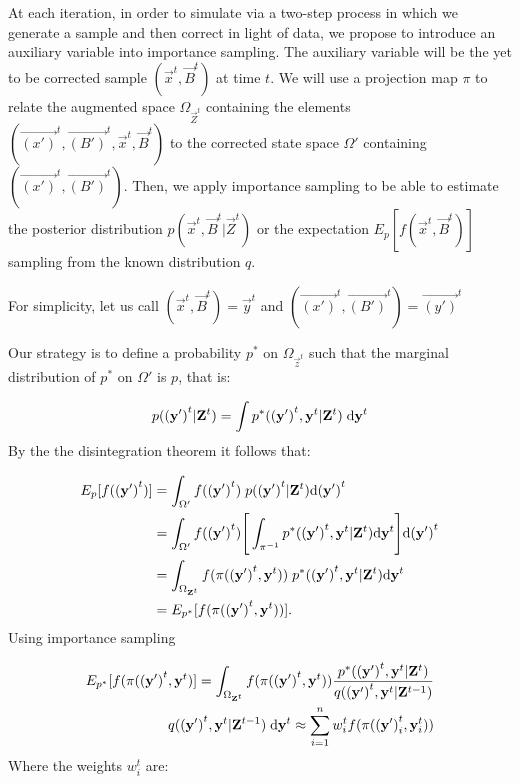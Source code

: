 At each iteration, in order to simulate via a two-step process in which we generate a sample and then correct in light of data, we propose to introduce an auxiliary variable into importance sampling. The auxiliary variable will be the yet to be corrected sample $(\vec{x}^{t}, \vec{B}^{t})$ at time $t$. We will use a projection map $\pi$ to relate the augmented space $\Omega_{\vec{Z}^{t}}$ containing the elements $(\vec{(x')}^{t}, \vec{(B')}^{t}, \vec{x}^{t}, \vec{B}^{t})$ to the corrected state space $\Omega'$ containing $(\vec{(x')}^{t}, \vec{(B')}^{t})$. Then, we apply importance sampling to be able to estimate the posterior distribution $p(\vec{x}^{t}, \vec{B}^{t} | \vec{Z}^{t})$ or the expectation $E_{p}[f(\vec{x}^{t},\vec{B}^{t})]$ sampling from the known distribution $q$.

For simplicity, let us call $(\vec{x}^{t}, \vec{B}^{t}) = \vec{y}^{t}$ and $(\vec{(x')}^{t}, \vec{(B')}^{t}) = \vec{(y')}^{t}$

Our strategy is to define a probability $p^*$ on $\Omega_{\vec{z}^{t}}$ such that the marginal distribution of $p^*$ on $\Omega'$ is $p$, that is:

\[
p(\mathbf{(y')}^{t} | \mathbf{Z}^{t}) = \int p^*(\mathbf{(y')}^{t}, \mathbf{y}^{t} | \mathbf{Z}^{t})\; \mathrm{d} \mathbf{y}^{t}
\]
By the the disintegration theorem it follows that:

\begin{align*}
E_{p}[f(\mathbf{(y')}^{t})]  &= \int_{\Omega'} f(\mathbf{(y')}^{t})\; p(\mathbf{(y')}^{t} | \mathbf{Z}^{t}) \mathrm{d} \mathbf{(y')}^{t} \\
&= \int_{\Omega'} f(\mathbf{(y')}^{t})\Bigg[\int_{\pi^{-1}} p^*(\mathbf{(y')}^{t}, \mathbf{y}^{t} | \mathbf{Z}^{t}) \mathrm{d} \mathbf{y}^{t}\Bigg] \mathrm{d} \mathbf{(y')}^{t} \\ 
&= \int_{\Omega_{\mathbf{Z}^{t}}} f(\pi(\mathbf{(y')}^{t}, \mathbf{y}^{t}))\; p^*(\mathbf{(y')}^{t}, \mathbf{y}^{t} | \mathbf{Z}^{t}) \mathrm{d} \mathbf{y}^{t} \\ 
&= E_{p^*}[f(\pi (\mathbf{(y')}^{t}, \mathbf{y}^{t}))].
\end{align*}
Using importance sampling

\begin{align*}
E_{p^*}[f(\pi (\mathbf{(y')}^{t}, \mathbf{y}^{t})] = \int_{\Omega_{\mathbf{Z}^{t}}} f(\pi(\mathbf{(y')}^{t}, \mathbf{y}^{t})) \frac{p^*(\mathbf{(y')}^{t}, \mathbf{y}^{t}|\mathbf{Z}^{t})} {q(\mathbf{(y')}^{t}, \mathbf{y}^{t} | \mathbf{Z}^{t-1})} \\
q(\mathbf{(y')}^{t}, \mathbf{y}^{t} | \mathbf{Z}^{t-1}) \; \mathrm{d} \mathbf{y}^{t} \approx \sum_{i=1}^n  w^{t}_i f(\pi (\mathbf{(y')}^{t}_i, \mathbf{y}^{t}_i))
\end{align*}
Where the weights $w^{t}_i$ are:

